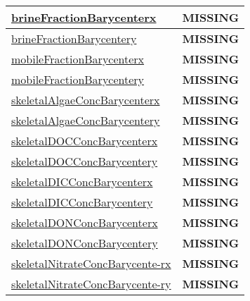 {\begin{center}
\begin{longtable}{| p{2.0in} | p{4.0in} |}
    \hline
    \hyperref[subsec:var_sec_tracer_barycenter_brineFractionBarycenterx]{brineFractionBarycenterx} & {\bf \color{red} MISSING} \\
    \hline
    \hyperref[subsec:var_sec_tracer_barycenter_brineFractionBarycentery]{brineFractionBarycentery} & {\bf \color{red} MISSING} \\
    \hline
    \hyperref[subsec:var_sec_tracer_barycenter_mobileFractionBarycenterx]{mobileFractionBarycenterx} & {\bf \color{red} MISSING} \\
    \hline
    \hyperref[subsec:var_sec_tracer_barycenter_mobileFractionBarycentery]{mobileFractionBarycentery} & {\bf \color{red} MISSING} \\
    \hline
    \hyperref[subsec:var_sec_tracer_barycenter_skeletalAlgaeConcBarycenterx]{skeletalAlgaeConcBarycenterx} & {\bf \color{red} MISSING} \\
    \hline
    \hyperref[subsec:var_sec_tracer_barycenter_skeletalAlgaeConcBarycentery]{skeletalAlgaeConcBarycentery} & {\bf \color{red} MISSING} \\
    \hline
    \hyperref[subsec:var_sec_tracer_barycenter_skeletalDOCConcBarycenterx]{skeletalDOCConcBarycenterx} & {\bf \color{red} MISSING} \\
    \hline
    \hyperref[subsec:var_sec_tracer_barycenter_skeletalDOCConcBarycentery]{skeletalDOCConcBarycentery} & {\bf \color{red} MISSING} \\
    \hline
    \hyperref[subsec:var_sec_tracer_barycenter_skeletalDICConcBarycenterx]{skeletalDICConcBarycenterx} & {\bf \color{red} MISSING} \\
    \hline
    \hyperref[subsec:var_sec_tracer_barycenter_skeletalDICConcBarycentery]{skeletalDICConcBarycentery} & {\bf \color{red} MISSING} \\
    \hline
    \hyperref[subsec:var_sec_tracer_barycenter_skeletalDONConcBarycenterx]{skeletalDONConcBarycenterx} & {\bf \color{red} MISSING} \\
    \hline
    \hyperref[subsec:var_sec_tracer_barycenter_skeletalDONConcBarycentery]{skeletalDONConcBarycentery} & {\bf \color{red} MISSING} \\
    \hline
    \hyperref[subsec:var_sec_tracer_barycenter_skeletalNitrateConcBarycenterx]{skeletalNitrateConcBarycente-}\hyperref[subsec:var_sec_tracer_barycenter_skeletalNitrateConcBarycenterx]{rx  }& {\bf \color{red} MISSING} \\
    \hline
    \hyperref[subsec:var_sec_tracer_barycenter_skeletalNitrateConcBarycentery]{skeletalNitrateConcBarycente-}\hyperref[subsec:var_sec_tracer_barycenter_skeletalNitrateConcBarycentery]{ry  }& {\bf \color{red} MISSING} \\

\end{longtable}
\end{center}}
